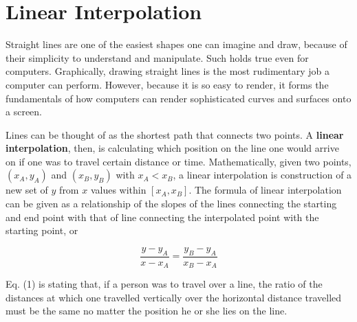 \documentclass[11pt, oneside, appendixprefix=Appendix]{article}
\theoremstyle{definition}
\numberwithin{figure}{section}
\begin{document}

\section{Linear Interpolation}

Straight lines are one of the easiest shapes one can imagine and draw, because of their simplicity to understand and manipulate. Such holds true even for computers. Graphically, drawing straight lines is the most rudimentary job a computer can perform. However, because it is so easy to render, it forms the fundamentals of how computers can render sophisticated curves and surfaces onto a screen.

Lines can be thought of as the shortest path that connects two points. A \textbf{linear interpolation}, then, is calculating which position on the line one would arrive on if one was to travel certain distance or time. Mathematically, given two points, $(x_A, y_A)$ and $(x_B,y_B)$ with $x_A < x_B$, a linear interpolation is construction of a new set of $y$ from $x$ values within $[x_A, x_B]$. The formula of linear interpolation can be given as a relationship of the slopes of the lines connecting the starting and end point with that of line connecting the interpolated point with the starting point, or

\begin{equation}
\frac{y-y_A}{x-x_A}=\frac{y_B-y_A}{x_B-x_A}
\end{equation}

Eq. (1) is stating that, if a person was to travel over a line, the ratio of the distances at which one travelled vertically over the horizontal distance travelled must be the same no matter the position he or she lies on the line.
\end{document}
